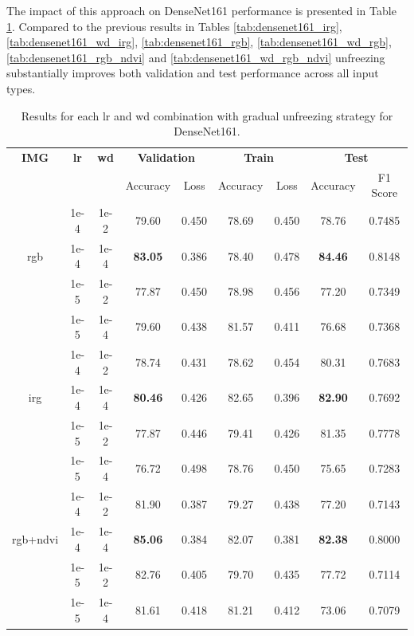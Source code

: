 The impact of this approach on DenseNet161 performance is presented in Table \ref{tab:best_runs}.
Compared to the previous results in Tables \ref{tab:densenet161_irg}, \ref{tab:densenet161_wd_irg}, 
\ref{tab:densenet161_rgb}, \ref{tab:densenet161_wd_rgb}, \ref{tab:densenet161_rgb_ndvi}
and \ref{tab:densenet161_wd_rgb_ndvi} unfreezing substantially improves both validation 
and test performance across all input types.

\begin{table}[h]
    \centering
    \renewcommand{\arraystretch}{1.3}
    \setlength{\tabcolsep}{6pt}
    \begin{tabular}{|c|c|c|cc|cc|cc|}
        \hline
        \textbf{IMG} & \textbf{\gls{lr}} & \textbf{\gls{wd}} & \multicolumn{2}{c|}{\textbf{Validation}} & \multicolumn{2}{c|}{\textbf{Train}} & \multicolumn{2}{c|}{\textbf{Test}} \\
        &  &  & Accuracy & Loss & Accuracy & Loss & Accuracy & F1 Score \\
        \hline
        & 1e-4 & 1e-2 & 79.60 & 0.450 & 78.69 & 0.450 & 78.76 & 0.7485 \\
        \gls{rgb} & 1e-4 & 1e-4 & \textbf{83.05} & 0.386 & 78.40 & 0.478 & \textbf{84.46} & 0.8148 \\
        & 1e-5 & 1e-2 & 77.87 & 0.450 & 78.98 & 0.456 & 77.20 & 0.7349 \\
        & 1e-5 & 1e-4 & 79.60 & 0.438 & 81.57 & 0.411 & 76.68 & 0.7368 \\
        \hline
        & 1e-4 & 1e-2 & 78.74 & 0.431 & 78.62 & 0.454 & 80.31 & 0.7683 \\
        \gls{irg} & 1e-4 & 1e-4 & \textbf{80.46} & 0.426 & 82.65 & 0.396 & \textbf{82.90} & 0.7692 \\
        & 1e-5 & 1e-2 & 77.87 & 0.446 & 79.41 & 0.426 & 81.35 & 0.7778 \\
        & 1e-5 & 1e-4 & 76.72 & 0.498 & 78.76 & 0.450 & 75.65 & 0.7283 \\
        \hline
        & 1e-4 & 1e-2 & 81.90 & 0.387 & 79.27 & 0.438 & 77.20 & 0.7143 \\
        \gls{rgb}+\gls{ndvi} & 1e-4 & 1e-4 & \textbf{85.06} & 0.384 & 82.07 & 0.381 & \textbf{82.38} & 0.8000 \\ 
        & 1e-5 & 1e-2 & 82.76 & 0.405 & 79.70 & 0.435 & 77.72 & 0.7114 \\
        & 1e-5 & 1e-4 & 81.61 & 0.418 & 81.21 & 0.412 & 73.06 & 0.7079 \\
        \hline
    \end{tabular}
    \caption{Results for each \gls{lr} and \gls{wd} combination with gradual unfreezing strategy for DenseNet161.}
    \label{tab:best_runs}
\end{table}



